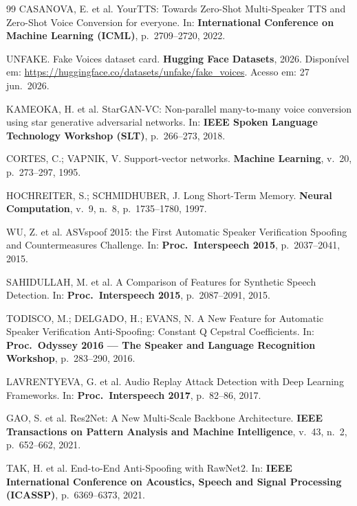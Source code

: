 \documentclass[12pt,a4paper]{article}
\begin{document}
\begin{thebibliography}{99}
	CASANOVA, E. et al.
	YourTTS: Towards Zero-Shot Multi-Speaker TTS and Zero-Shot Voice Conversion
	for everyone.
	In: \textbf{International Conference on Machine Learning (ICML)},
	p.~2709--2720, 2022.
	
	UNFAKE.
	Fake Voices dataset card.
	\textbf{Hugging Face Datasets}, 2026.
	Disponível em: \url{https://huggingface.co/datasets/unfake/fake_voices}.
	Acesso em: 27 jun.\ 2026.
	
	KAMEOKA, H. et al.
	StarGAN-VC: Non-parallel many-to-many voice conversion using star generative
	adversarial networks.
	In: \textbf{IEEE Spoken Language Technology Workshop (SLT)},
	p.~266--273, 2018.
	
	CORTES, C.; VAPNIK, V.
	Support-vector networks.
	\textbf{Machine Learning},
	v.~20, p.~273--297, 1995.
	
	HOCHREITER, S.; SCHMIDHUBER, J.
	Long Short-Term Memory.
	\textbf{Neural Computation},
	v.~9, n.~8, p.~1735--1780, 1997.
	
	WU, Z. et al.
	ASVspoof 2015: the First Automatic Speaker Verification Spoofing and
	Countermeasures Challenge.
	In: \textbf{Proc.\ Interspeech 2015}, p.~2037--2041, 2015.
	
	SAHIDULLAH, M. et al.
	A Comparison of Features for Synthetic Speech Detection.
	In: \textbf{Proc.\ Interspeech 2015}, p.~2087--2091, 2015.
	
	TODISCO, M.; DELGADO, H.; EVANS, N.
	A New Feature for Automatic Speaker Verification Anti-Spoofing:
	Constant Q Cepstral Coefficients.
	In: \textbf{Proc.\ Odyssey 2016 --- The Speaker and Language Recognition
		Workshop}, p.~283--290, 2016.
	
	LAVRENTYEVA, G. et al.
	Audio Replay Attack Detection with Deep Learning Frameworks.
	In: \textbf{Proc.\ Interspeech 2017}, p.~82--86, 2017.
	
	GAO, S. et al.
	Res2Net: A New Multi-Scale Backbone Architecture.
	\textbf{IEEE Transactions on Pattern Analysis and Machine Intelligence},
	v.~43, n.~2, p.~652--662, 2021.
	
	TAK, H. et al.
	End-to-End Anti-Spoofing with RawNet2.
	In: \textbf{IEEE International Conference on Acoustics, Speech and Signal
		Processing (ICASSP)}, p.~6369--6373, 2021.
	

\end{thebibliography}
\end{document}
